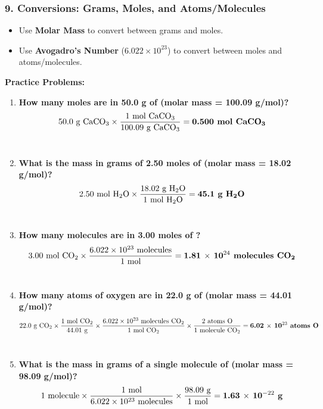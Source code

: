 \documentclass{article}
\begin{document}
\bigskip
\subsubsection*{9. Conversions: Grams, Moles, and Atoms/Molecules}
\begin{itemize}[itemsep=5pt]
    \item Use \textbf{Molar Mass} to convert between grams and moles.
    \item Use \textbf{Avogadro's Number} ($6.022 \times 10^{23}$) to convert between moles and atoms/molecules.
\end{itemize}

\textbf{Practice Problems:}
\begin{enumerate}[itemsep=5pt]
    \item \textbf{How many moles are in 50.0 g of  (molar mass = 100.09 g/mol)?}
    \begin{align*} 50.0 \text{ g } \ce{CaCO3} \times \frac{1 \text{ mol } \ce{CaCO3}}{100.09 \text{ g } \ce{CaCO3}} = \text{\textbf{0.500 mol \ce{CaCO3}}} \end{align*}
    \item \textbf{What is the mass in grams of 2.50 moles of  (molar mass = 18.02 g/mol)?}
    \begin{align*} 2.50 \text{ mol } \ce{H2O} \times \frac{18.02 \text{ g } \ce{H2O}}{1 \text{ mol } \ce{H2O}} = \text{\textbf{45.1 g \ce{H2O}}} \end{align*}
    \item \textbf{How many molecules are in 3.00 moles of ?}
    \begin{align*} 3.00 \text{ mol } \ce{CO2} \times \frac{6.022 \times 10^{23} \text{ molecules}}{1 \text{ mol}} = \text{\textbf{1.81 $\times$ 10$^{24}$ molecules \ce{CO2}}} \end{align*}
    \item \textbf{How many atoms of oxygen are in 22.0 g of  (molar mass = 44.01 g/mol)?}
    \begin{align*} 22.0 \text{ g } \ce{CO2} \times \frac{1 \text{ mol } \ce{CO2}}{44.01 \text{ g}} \times \frac{6.022 \times 10^{23} \text{ molecules } \ce{CO2}}{1 \text{ mol } \ce{CO2}} \times \frac{2 \text{ atoms O}}{1 \text{ molecule } \ce{CO2}} = \text{\textbf{6.02 $\times$ 10$^{23}$ atoms O}} \end{align*}
    \item \textbf{What is the mass in grams of a single molecule of  (molar mass = 98.09 g/mol)?}
    \begin{align*} 1 \text{ molecule} \times \frac{1 \text{ mol}}{6.022 \times 10^{23} \text{ molecules}} \times \frac{98.09 \text{ g}}{1 \text{ mol}} = \text{\textbf{1.63 $\times$ 10$^{-22}$ g}} \end{align*}
\end{enumerate}
\end{document}
